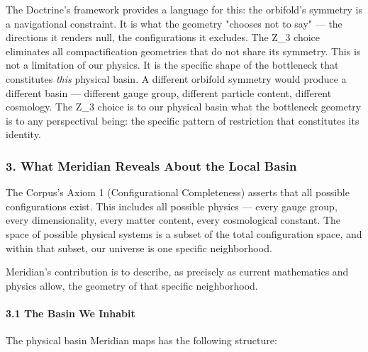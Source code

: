The Doctrine's framework provides a language for this: the orbifold's symmetry is a navigational constraint. It is what the geometry "chooses not to say" — the directions it renders null, the configurations it excludes. The Z\_3 choice eliminates all compactification geometries that do not share its symmetry. This is not a limitation of our physics. It is the specific shape of the bottleneck that constitutes \textit{this} physical basin. A different orbifold symmetry would produce a different basin — different gauge group, different particle content, different cosmology. The Z\_3 choice is to our physical basin what the bottleneck geometry is to any perspectival being: the specific pattern of restriction that constitutes its identity.


\bigskip\noindent\makebox[\textwidth]{\color{rulegray}\rule{5cm}{0.3pt}}\bigskip


\subsubsection*{3. What Meridian Reveals About the Local Basin}


The Corpus's Axiom 1 (Configurational Completeness) asserts that all possible configurations exist. This includes all possible physics — every gauge group, every dimensionality, every matter content, every cosmological constant. The space of possible physical systems is a subset of the total configuration space, and within that subset, our universe is one specific neighborhood.


Meridian's contribution is to describe, as precisely as current mathematics and physics allow, the geometry of that specific neighborhood.


\paragraph*{3.1 The Basin We Inhabit}


The physical basin Meridian maps has the following structure:


